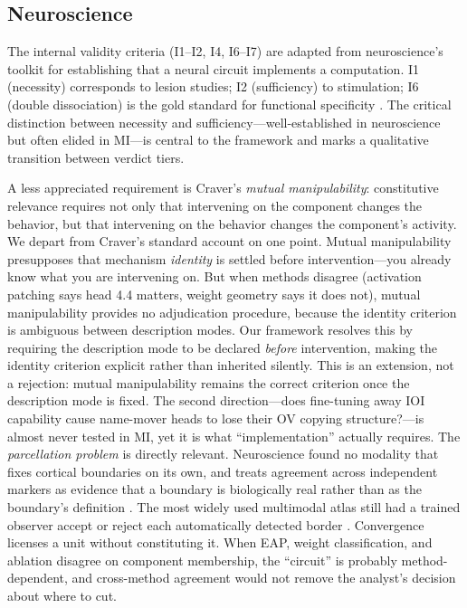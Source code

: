 \documentclass{article}
\begin{document}
\subsection{Neuroscience}
\label{sec:neuro}

The internal validity criteria (I1--I2, I4, I6--I7) are adapted from neuroscience's toolkit for establishing that a neural circuit implements a computation. I1 (necessity) corresponds to lesion studies; I2 (sufficiency) to stimulation; I6 (double dissociation) is the gold standard for functional specificity \citep{woodward2003making}. The critical distinction between necessity and sufficiency---well-established in neuroscience but often elided in MI---is central to the framework and marks a qualitative transition between verdict tiers.

A less appreciated requirement is Craver's \emph{mutual manipulability}: constitutive relevance requires not only that intervening on the component changes the behavior, but that intervening on the behavior changes the component's activity. We depart from Craver's standard account on one point. Mutual manipulability presupposes that mechanism \emph{identity} is settled before intervention---you already know what you are intervening on. But when methods disagree (activation patching says head 4.4 matters, weight geometry says it does not), mutual manipulability provides no adjudication procedure, because the identity criterion is ambiguous between description modes. Our framework resolves this by requiring the description mode to be declared \emph{before} intervention, making the identity criterion explicit rather than inherited silently. This is an extension, not a rejection: mutual manipulability remains the correct criterion once the description mode is fixed. The second direction---does fine-tuning away IOI capability cause name-mover heads to lose their OV copying structure?---is almost never tested in MI, yet it is what ``implementation'' actually requires. The \emph{parcellation problem} is directly relevant. Neuroscience found no modality that fixes cortical boundaries on its own, and treats agreement across independent markers as evidence that a boundary is biologically real rather than as the boundary's definition \citep{eickhoff2018imaging}. The most widely used multimodal atlas still had a trained observer accept or reject each automatically detected border \citep{glasser2016multi}. Convergence licenses a unit without constituting it. When EAP, weight classification, and ablation disagree on component membership, the ``circuit'' is probably method-dependent, and cross-method agreement would not remove the analyst's decision about where to cut.
\end{document}
